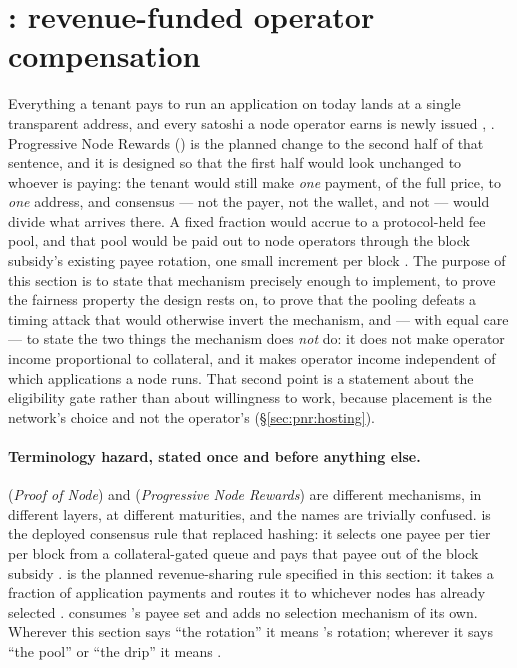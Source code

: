 \section{\PNR: revenue-funded operator compensation}
\label{sec:pnr}\label{sec:07-pnr}

Everything a tenant pays to run an application on \Flux today lands at a single transparent address,
and every satoshi a node operator earns is newly issued \shipped
{},
. Progressive Node Rewards
(\PNR) is the planned change to the second half of that sentence, and it is designed so that the
first half would look unchanged to whoever is paying: the tenant would still make \emph{one}
payment, of the full price, to \emph{one} address, and consensus --- not the payer, not the wallet,
and not \FluxOS --- would divide what arrives there. A fixed fraction would accrue to a
protocol-held fee pool, and that pool would be paid out to node operators through the block
subsidy's existing payee rotation, one small increment per block \planned
{}. The purpose of this section is to state that
mechanism precisely enough to implement, to
prove the fairness property the design rests on, to prove that the pooling defeats a timing attack
that would otherwise invert the mechanism, and --- with equal care --- to state the two things the
mechanism does \emph{not} do: it does not make operator income proportional to collateral, and it
makes operator income independent of which applications a node runs. That second point is a
statement about the eligibility gate rather than about willingness to work, because placement is the
network's choice and not the operator's (\S\ref{sec:pnr:hosting}).

\paragraph{Terminology hazard, stated once and before anything else.}
\PoN (\emph{Proof of Node}) and \PNR (\emph{Progressive Node Rewards}) are different mechanisms, in
different layers, at different maturities, and the names are trivially confused. \PoN is the
deployed consensus rule that replaced hashing: it selects one payee per tier per block from a
collateral-gated queue and pays that payee out of the block subsidy \shipped
{}. \PNR is the planned revenue-sharing rule
specified in this section: it takes a fraction of application payments and routes it to whichever
nodes \PoN has already selected \planned {}. \PNR consumes \PoN's
payee set and adds no selection mechanism of its own. Wherever this section says ``the rotation'' it
means \PoN's rotation; wherever it says ``the pool'' or ``the drip'' it means \PNR.

